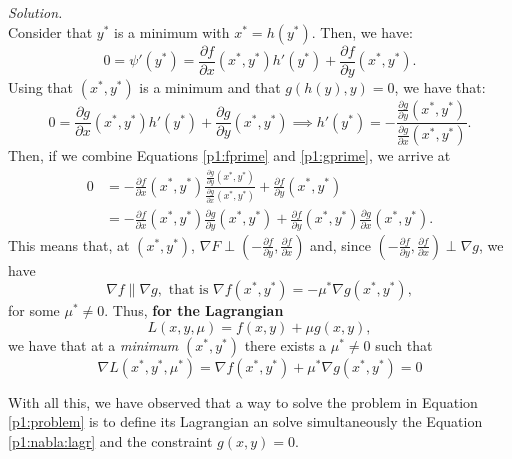 \documentclass[a4paper]{article}
\newenvironment{solution}
    {\textit{Solution.}\\}
    {}
\begin{document}
\begin{solution}
  Consider that \(y^*\) is a minimum with \(x^* = h(y^*)\). Then, we have:
  \begin{equation}\label{p1:fprime}
    0 = \psi'(y^*) = \frac{\partial f}{\partial x} (x^*, y^*)h'(y^*) + \frac{\partial f}{\partial y}(x^*, y^*).
  \end{equation}
  Using that \((x^*,y^*)\) is a minimum and that \(g(h(y),y) = 0\), we have that:
  \begin{equation}\label{p1:gprime}
    0 = \frac{\partial g}{\partial x}(x^*, y^*)h'(y^*) + \frac{\partial g}{\partial y}(x^*, y^*) \implies h'(y^*) = - \frac{\frac{\partial g}{\partial y}(x^{*},y^{*})}{\frac{\partial g}{\partial x}(x^{*},y^{*})}.
  \end{equation}
  Then, if we combine Equations \eqref{p1:fprime} and \eqref{p1:gprime}, we arrive at
  \begin{align*}
    0 & = - \frac{\partial f}{\partial x}(x^*,y^*) \frac{\frac{\partial g}{\partial y}(x^{*},y^{*})}{\frac{\partial g}{\partial x}(x^{*},y^{*})} + \frac{\partial f}{\partial y}(x^*, y^*) \\
      & = - \frac{\partial f}{\partial x}(x^*,y^*)\frac{\partial g}{\partial y}(x^{*},y^{*}) +  \frac{\partial f}{\partial y}(x^*, y^*)\frac{\partial g}{\partial x}(x^{*},y^{*}).
  \end{align*}
  This means that, at \((x^*,y^*)\), \(\nabla F \perp \left(- \frac{\partial f}{\partial y}, \frac{\partial f}{\partial x}\right)\) and, since \(\left(- \frac{\partial f}{\partial y}, \frac{\partial f}{\partial x}\right) \perp \nabla g\), we have
  \[
    \nabla f \parallel \nabla g, \text{ that is } \nabla f(x^*,y^*) = -\mu^* \nabla g(x^*,y^*),
  \]
  for some \(\mu^* \neq 0\). Thus, \textbf{for the Lagrangian}
  \[
    L(x,y,\mu) = f(x,y) + \mu g(x,y),
  \]
  we have that at a \emph{minimum} \((x^*,y^*)\) there exists a \(\mu^* \neq 0\) such that
  \begin{equation}\label{p1:nabla:lagr}
    \nabla L(x^*,y^*,\mu^*) = \nabla f(x^*,y^*) + \mu^* \nabla g(x^*,y^*) = 0
  \end{equation}

  With all this, we have observed that a way to solve the problem in Equation \eqref{p1:problem} is to define its Lagrangian an solve simultaneously the Equation \eqref{p1:nabla:lagr} and the constraint \(g(x,y) = 0\).

\end{solution}
\end{document}
